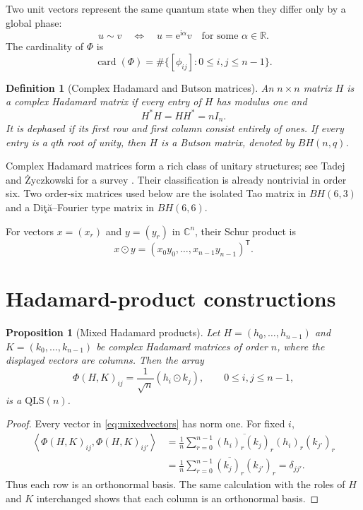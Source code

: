 \documentclass[11pt,a4paper]{article}
\newcommand{\C}{\mathbb{C}}
\newcommand{\R}{\mathbb{R}}
\newcommand{\QLS}{\mathrm{QLS}}
\newcommand{\card}{\operatorname{card}}
\newcommand{\od}{\mathbin{\odot}}
\newcommand{\ii}{\mathrm{i}}
\newcommand{\e}{\mathrm{e}}
\newcommand{\ip}[2]{\left\langle #1,#2\right\rangle}
\newtheorem{definition}{Definition}
\newtheorem{proposition}{Proposition}
\begin{document}
Two unit vectors represent the same quantum state when they differ only by a
global phase:
\[
  u\sim v
  \quad\Longleftrightarrow\quad
  u=\e^{\ii\alpha}v
  \quad\text{for some }\alpha\in\R.
\]
The cardinality of $\Phi$ is
\[
  \card(\Phi)
  =\#\bigl\{[\phi_{ij}]:0\leq i,j\leq n-1\bigr\}.
\]

\begin{definition}[Complex Hadamard and Butson matrices]
An $n\times n$ matrix $H$ is a complex Hadamard matrix if every entry of $H$
has modulus one and
\[
  H^*H=HH^*=nI_n.
\]
It is \emph{dephased} if its first row and first column consist entirely of
ones.  If every entry is a $q$th root of unity, then $H$ is a Butson matrix,
denoted by $BH(n,q)$.
\end{definition}

Complex Hadamard matrices form a rich class of unitary structures; see
Tadej and {\.{Z}}yczkowski for a survey \cite{TadejZyczkowski2006}.  Their
classification is already nontrivial in order six.  Two order-six matrices
used below are the isolated Tao matrix in $BH(6,3)$ and a Di\c{t}\u{a}--Fourier
type matrix in $BH(6,6)$.

For vectors $x=(x_r)$ and $y=(y_r)$ in $\C^n$, their Schur product is
\[
  x\od y=(x_0y_0,\ldots,x_{n-1}y_{n-1})^{\mathsf T}.
\]

\section{Hadamard-product constructions}\label{sec:hadprod}

\begin{proposition}[Mixed Hadamard products]\label{prop:mixed}
Let $H=(h_0,\ldots,h_{n-1})$ and $K=(k_0,\ldots,k_{n-1})$ be complex
Hadamard matrices of order $n$, where the displayed vectors are columns.
Then the array
\begin{equation}\label{eq:mixedvectors}
  \Phi(H,K)_{ij}=\frac1{\sqrt n}(h_i\od k_j),
  \qquad 0\leq i,j\leq n-1,
\end{equation}
is a $\QLS(n)$.
\end{proposition}

\begin{proof}
Every vector in \eqref{eq:mixedvectors} has norm one.  For fixed $i$,
\[
\begin{aligned}
 \ip{\Phi(H,K)_{ij}}{\Phi(H,K)_{ij'}}
 &=\frac1n\sum_{r=0}^{n-1}
   \overline{(h_i)_r(k_j)_r}(h_i)_r(k_{j'})_r\\
 &=\frac1n\sum_{r=0}^{n-1}\overline{(k_j)_r}(k_{j'})_r
 =\delta_{jj'}.
\end{aligned}
\]
Thus each row is an orthonormal basis.  The same calculation with the roles of
$H$ and $K$ interchanged shows that each column is an orthonormal basis.
\end{proof}
\end{document}

